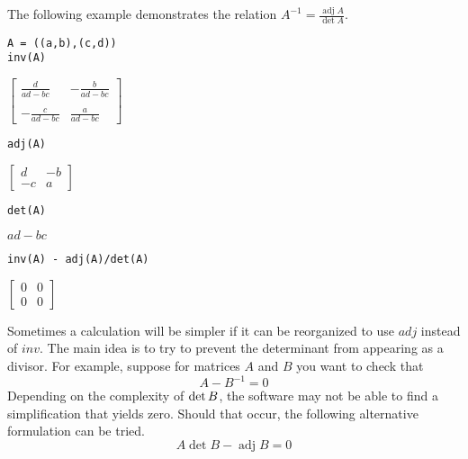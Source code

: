 \bigskip
\noindent
The following example demonstrates the relation
$A^{-1}=\frac{\operatorname{adj}A}{\operatorname{det}A}$.

{\color{blue}
\begin{verbatim}
A = ((a,b),(c,d))
inv(A)
\end{verbatim}
}

\noindent
$\displaystyle
\begin{bmatrix}
{\displaystyle \frac{d}{ad-bc}} & {\displaystyle -\frac{b}{ad-bc}}
\\
\\
{\displaystyle -\frac{c}{ad-bc}} & {\displaystyle \frac{a}{ad-bc}}
\end{bmatrix}
$

{\color{blue}
\begin{verbatim}
adj(A)
\end{verbatim}
}

\noindent
$\displaystyle
\begin{bmatrix}
d & -b
\\[1ex]
-c & a
\end{bmatrix}
$

{\color{blue}
\begin{verbatim}
det(A)
\end{verbatim}
}

\noindent
$ad-bc$

{\color{blue}
\begin{verbatim}
inv(A) - adj(A)/det(A)
\end{verbatim}
}

\noindent
$\displaystyle
\begin{bmatrix}
0 & 0
\\[1ex]
0 & 0
\end{bmatrix}
$

\bigskip
\noindent
Sometimes a calculation will be simpler if it can be reorganized to use
$adj$ instead of $inv$.
The main idea is to try to prevent the determinant from appearing as a
divisor.
For example, suppose for matrices $A$ and $B$ you want to check that
\begin{equation*}
{A}-{B}^{-1}=0
\end{equation*}
Depending on the complexity of $\mathop{\rm det}B$, the software
may not be able to find a simplification that yields zero.
Should that occur, the following alternative formulation can be tried.
\begin{equation*}
A\operatorname{det}B-\operatorname{adj}B=0
\end{equation*}

